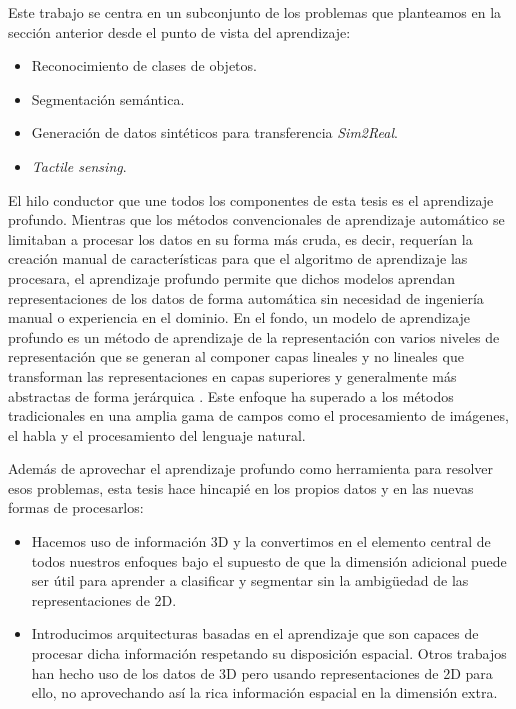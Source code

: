 Este trabajo se centra en un subconjunto de los problemas que planteamos en la sección anterior desde el punto de vista del aprendizaje:

\begin{itemize}
\item Reconocimiento de clases de objetos.
\item Segmentación semántica.
\item Generación de datos sintéticos para transferencia \emph{Sim2Real}.
\item \emph{Tactile sensing}.
\end{itemize}

El hilo conductor que une todos los componentes de esta tesis es el aprendizaje profundo. Mientras que los métodos convencionales de aprendizaje automático se limitaban a procesar los datos en su forma más cruda, es decir, requerían la creación manual de características para que el algoritmo de aprendizaje las procesara, el aprendizaje profundo permite que dichos modelos aprendan representaciones de los datos de forma automática sin necesidad de ingeniería manual o experiencia en el dominio. En el fondo, un modelo de aprendizaje profundo es un método de aprendizaje de la representación con varios niveles de representación que se generan al componer capas lineales y no lineales que transforman las representaciones en capas superiores y generalmente más abstractas de forma jerárquica \cite{Lecun2015}. Este enfoque ha superado a los métodos tradicionales en una amplia gama de campos como el procesamiento de imágenes, el habla y el procesamiento del lenguaje natural.

Además de aprovechar el aprendizaje profundo como herramienta para resolver esos problemas, esta tesis hace hincapié en los propios datos y en las nuevas formas de procesarlos:

\begin{itemize}
\item Hacemos uso de información \ac{3D} y la convertimos en el elemento central de todos nuestros enfoques bajo el supuesto de que la dimensión adicional puede ser útil para aprender a clasificar y segmentar sin la ambigüedad de las representaciones de \ac{2D}.
\item Introducimos arquitecturas basadas en el aprendizaje que son capaces de procesar dicha información respetando su disposición espacial. Otros trabajos han hecho uso de los datos de \ac{3D} pero usando representaciones de \ac{2D} para ello, no aprovechando así la rica información espacial en la dimensión extra.
\end{itemize}

